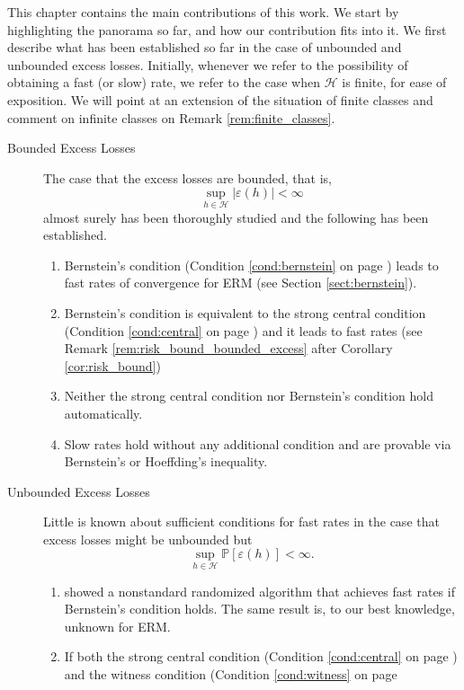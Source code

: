 \documentclass{uvamath}
\newcommand*{\calH}{\mathcal{H}}
\newcommand*{\bbP}{\mathbb{P}}
\theoremstyle{remark}
\theoremstyle{definition}
\theoremstyle{definition}
\theoremstyle{definition}
\theoremstyle{definition}
\theoremstyle{definition}
\begin{document}
This chapter contains the main contributions of this work. We start by
highlighting the panorama so far, and how our contribution fits into
it. We first describe what has been established so far in the case of
unbounded and unbounded excess losses. Initially, whenever we refer to
the possibility of obtaining a fast (or slow) rate, we refer to the
case when $\calH$ is finite, for ease of exposition. We will point at
an extension of the situation of finite classes and comment on
infinite classes on Remark \ref{rem:finite_classes}.

\begin{description}
\item[Bounded Excess Losses] The case that the excess losses are
  bounded, that is, $$\sup_{h\in\calH}|\varepsilon(h)|<\infty$$ almost
  surely has been thoroughly studied and the following has been
  established.
  \begin{enumerate}
  \item Bernstein's condition (Condition \ref{cond:bernstein} on page
    \pageref{cond:bernstein}) leads to fast rates of convergence for
    ERM (see Section \ref{sect:bernstein}).
  \item Bernstein's condition is equivalent to the strong central
    condition (Condition \ref{cond:central} on page
    \pageref{cond:central}) \citep{van_erven_fast_2015} and it leads
    to fast rates (see Remark \ref{rem:risk_bound_bounded_excess}
    after Corollary \ref{cor:risk_bound})
  \item Neither the strong central condition nor Bernstein's condition
    hold automatically.
  \item Slow rates hold without any additional condition and are
    provable via Bernstein's or Hoeffding's inequality.
  \end{enumerate}
\item[Unbounded Excess Losses] Little is known about sufficient
  conditions for fast rates in the case that excess losses might be
  unbounded but $$\sup_{h\in\calH}\bbP[\varepsilon(h)]<\infty.$$
  \begin{enumerate}
  \item \citet{audibert_fast_2009} showed a nonstandard randomized
    algorithm that achieves fast rates if Bernstein's condition
    holds. The same result is, to our best knowledge, unknown for ERM.
  \item If both the strong central condition (Condition
    \ref{cond:central} on page \pageref{cond:central}) and the witness
    condition (Condition \ref{cond:witness} on page

\end{enumerate}
\end{description}
\end{document}
